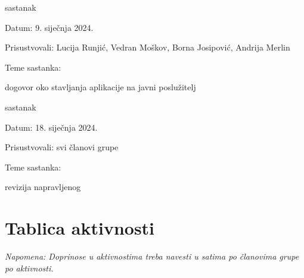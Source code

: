 \begin{packed_enum}
			\item sastanak
			
			\item[] \begin{packed_item}
				\item Datum: 9. siječnja 2024.
				\item Prisustvovali: Lucija Runjić, Vedran Moškov, Borna Josipović, Andrija Merlin
				\item Teme sastanka:
				\begin{packed_item}
					\item dogovor oko stavljanja aplikacije na javni poslužitelj
				\end{packed_item}
			\end{packed_item}
			
			
			\item sastanak
			
			\item[] \begin{packed_item}
				\item Datum: 18. siječnja 2024.
				\item Prisustvovali: svi članovi grupe
				\item Teme sastanka:
				\begin{packed_item}
					\item revizija napravljenog
				\end{packed_item}
			\end{packed_item}
		\end{packed_enum}
		
		
		
		\eject
		\section*{Tablica aktivnosti}
			
			 \textit{Napomena: Doprinose u aktivnostima treba navesti u satima po članovima grupe po aktivnosti.}

